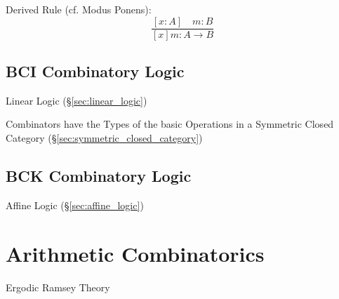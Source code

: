 Derived Rule (cf. Modus Ponens):
\[
  \frac{
    [x:A] \quad m:B
  }{
    [x]m:A \rightarrow B
  }
\]



\subsection{BCI Combinatory Logic}\label{sec:bci_logic}

Linear Logic (\S\ref{sec:linear_logic})

Combinators have the Types of the basic Operations in a Symmetric
Closed Category (\S\ref{sec:symmetric_closed_category})


\subsection{BCK Combinatory Logic}\label{sec:bck_logic}

Affine Logic (\S\ref{sec:affine_logic})



\section{Arithmetic Combinatorics}\label{sec:arithmetic_combinatorics}

Ergodic Ramsey Theory

